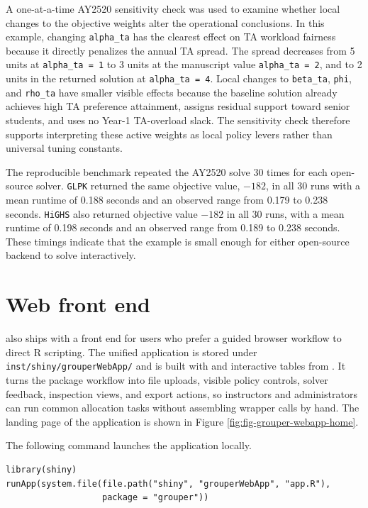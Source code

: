 A one-at-a-time AY2520 sensitivity check was used to examine whether local
changes to the objective weights alter the operational conclusions. In this
example, changing \texttt{alpha\_ta} has the clearest effect on TA workload fairness
because it directly penalizes the annual TA spread. The
spread decreases from 5 units at \texttt{alpha\_ta\ =\ 1} to 3 units at the manuscript
value \texttt{alpha\_ta\ =\ 2}, and to 2 units in the returned solution at
\texttt{alpha\_ta\ =\ 4}. Local changes to \texttt{beta\_ta}, \texttt{phi}, and \texttt{rho\_ta} have smaller
visible effects because the baseline solution already achieves high TA
preference attainment, assigns residual support toward senior students, and
uses no Year-1 TA-overload slack. The sensitivity check therefore supports
interpreting these active weights as local policy levers rather than universal
tuning constants.

The reproducible benchmark repeated the AY2520 solve 30 times for each
open-source solver. \texttt{GLPK} returned the same objective value,
\(-182\), in all 30 runs with a mean
runtime of 0.188 seconds and an observed
range from 0.179 to
0.238 seconds. \texttt{HiGHS} also returned
objective value \(-182\) in all 30
runs, with a mean runtime of 0.198
seconds and an observed range from 0.189
to 0.238 seconds. These timings indicate
that the example is small enough for either open-source backend to solve
interactively.

\section{Web front end}\label{web-front-end}

 also ships with a  \citep{R-shiny} front end for users
who prefer a guided browser workflow to direct R scripting. The unified
application is stored under \texttt{inst/shiny/grouperWebApp/} and is built with
 \citep{R-bslib} and interactive tables from  \citep{R-DT}. It
turns the package workflow into file uploads, visible policy controls, solver
feedback, inspection views, and export actions, so instructors and
administrators can run common allocation tasks without assembling wrapper calls
by hand. The landing page of the application is shown in Figure
\ref{fig:fig-grouper-webapp-home}.

The following command launches the application locally.

\begin{verbatim}
library(shiny)
runApp(system.file(file.path("shiny", "grouperWebApp", "app.R"),
                   package = "grouper"))
\end{verbatim}

